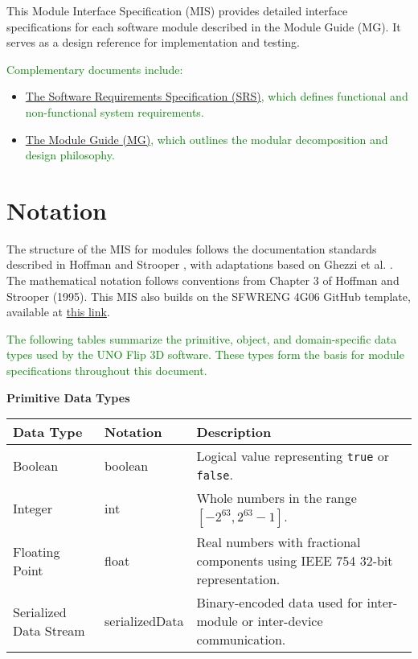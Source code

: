 \documentclass[12pt, titlepage]{article}
\newcommand{\added}[1]{\textcolor{green}{#1}}
\begin{document}
This Module Interface Specification (MIS) provides detailed interface specifications for each software module described in the Module Guide (MG). It serves as a design reference for implementation and testing.

\added{Complementary documents include:}
\begin{itemize}
    \item \added{\href{https://github.com/simon-0215/UNO-Flip-3D/tree/main/docs/SRS-Volere}{The Software Requirements Specification (SRS)}, which defines functional and non-functional system requirements.}
    \item \added{\href{https://github.com/simon-0215/UNO-Flip-3D/blob/main/docs/Design/SoftArchitecture/MG.pdf}{The Module Guide (MG)}, which outlines the modular decomposition and design philosophy.}
\end{itemize}

\section{Notation}

The structure of the MIS for modules follows the documentation standards described in Hoffman and Strooper \cite{HoffmanAndStrooper1995}, with adaptations based on Ghezzi et al. \cite{GhezziEtAl2003}. The mathematical notation follows conventions from Chapter 3 of Hoffman and Strooper (1995). This MIS also builds on the SFWRENG 4G06 GitHub template, available at \href{https://github.com/smiths/capTemplate/tree/main/docs/Design/SoftDetailedDes}{this link}.


\added{The following tables summarize the primitive, object, and domain-specific data types used by the UNO Flip 3D software. These types form the basis for module specifications throughout this document.}

\vspace{0.5em}
\noindent
\textbf{Primitive Data Types}

\begin{center}
\renewcommand{\arraystretch}{1.2}
\begin{tabular}{l l p{8cm}} 
\toprule 
\textbf{Data Type} & \textbf{Notation} & \textbf{Description}\\ 
\midrule
Boolean & boolean & Logical value representing \texttt{true} or \texttt{false}. \\
Integer & int & Whole numbers in the range $[-2^{63}, 2^{63}-1]$.\\
Floating Point & float & Real numbers with fractional components using IEEE 754 32-bit representation.\\
Serialized Data Stream & serializedData & Binary-encoded data used for inter-module or inter-device communication.\\
\bottomrule
\end{tabular} 
\end{center}
\end{document}

